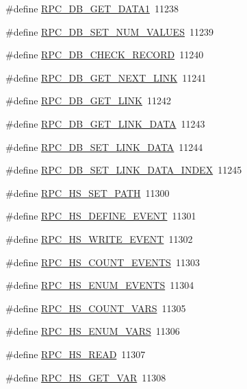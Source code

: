 \begin{DoxyCompactItemize}
\item 
\#define \hyperlink{group__mrpcdefineh_ga62aeeff0128db0be59b11c0b7c731414}{RPC\_\-DB\_\-GET\_\-DATA1}~11238
\item 
\#define \hyperlink{group__mrpcdefineh_ga2900e0aea433fd79525a7b6fe1d78fc9}{RPC\_\-DB\_\-SET\_\-NUM\_\-VALUES}~11239
\item 
\#define \hyperlink{group__mrpcdefineh_gab25336d988315c6922306ee2994c6991}{RPC\_\-DB\_\-CHECK\_\-RECORD}~11240
\item 
\#define \hyperlink{group__mrpcdefineh_ga71d74e83676cb772050c47235465b5f5}{RPC\_\-DB\_\-GET\_\-NEXT\_\-LINK}~11241
\item 
\#define \hyperlink{group__mrpcdefineh_ga85c75377ece6e2281233e853ec3292bf}{RPC\_\-DB\_\-GET\_\-LINK}~11242
\item 
\#define \hyperlink{group__mrpcdefineh_ga9836d58a3935ec9af877ac4f44ed471c}{RPC\_\-DB\_\-GET\_\-LINK\_\-DATA}~11243
\item 
\#define \hyperlink{group__mrpcdefineh_ga90e804c905002f3ab32f9eb2106103fb}{RPC\_\-DB\_\-SET\_\-LINK\_\-DATA}~11244
\item 
\#define \hyperlink{group__mrpcdefineh_ga6a1b58ac9701edc445b4ec1e87defc13}{RPC\_\-DB\_\-SET\_\-LINK\_\-DATA\_\-INDEX}~11245
\item 
\#define \hyperlink{group__mrpcdefineh_gae96ac179fd36bfa722adab529b8d547e}{RPC\_\-HS\_\-SET\_\-PATH}~11300
\item 
\#define \hyperlink{group__mrpcdefineh_ga0707f52e8b8045c5d982abde3ae82177}{RPC\_\-HS\_\-DEFINE\_\-EVENT}~11301
\item 
\#define \hyperlink{group__mrpcdefineh_ga79eecfeb4c159e74bd640263f08a92af}{RPC\_\-HS\_\-WRITE\_\-EVENT}~11302
\item 
\#define \hyperlink{group__mrpcdefineh_gaa8cdf659ab08fa5857d82b73e20bf47b}{RPC\_\-HS\_\-COUNT\_\-EVENTS}~11303
\item 
\#define \hyperlink{group__mrpcdefineh_gac43c0f6b242f855a6e30335913ef2de9}{RPC\_\-HS\_\-ENUM\_\-EVENTS}~11304
\item 
\#define \hyperlink{group__mrpcdefineh_ga17a4f1c2652c0b2c77d1aee2cbad0ce3}{RPC\_\-HS\_\-COUNT\_\-VARS}~11305
\item 
\#define \hyperlink{group__mrpcdefineh_ga03b69c70087647cbea450ba968bcec9b}{RPC\_\-HS\_\-ENUM\_\-VARS}~11306
\item 
\#define \hyperlink{group__mrpcdefineh_gae54df220cd65f15f7669bba8f031e6a6}{RPC\_\-HS\_\-READ}~11307
\item 
\#define \hyperlink{group__mrpcdefineh_ga80424615873f6deec4b651d65133a241}{RPC\_\-HS\_\-GET\_\-VAR}~11308

\end{DoxyCompactItemize}
